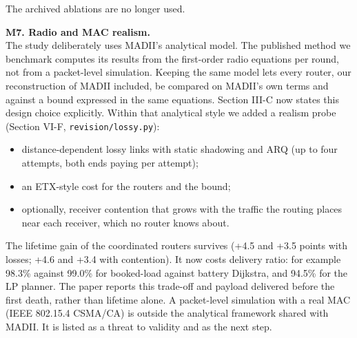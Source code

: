 \documentclass[11pt]{article}
\begin{document}
The archived ablations are no longer used.

\medskip\noindent \textbf{M7. Radio and MAC realism.}\\
The study deliberately uses MADII's analytical model. The published method we benchmark computes its results from the first-order radio equations per round, not from a packet-level simulation. Keeping the same model lets every router, our reconstruction of MADII included, be compared on MADII's own terms and against a bound expressed in the same equations. Section III-C now states this design choice explicitly. Within that analytical style we added a realism probe (Section VI-F, \texttt{revision/lossy.py}):

\begin{itemize}[leftmargin=*,itemsep=2pt]
\item distance-dependent lossy links with static shadowing and ARQ (up to four attempts, both ends paying per attempt);
\item an ETX-style cost for the routers and the bound;
\item optionally, receiver contention that grows with the traffic the routing places near each receiver, which no router knows about.
\end{itemize}

The lifetime gain of the coordinated routers survives (+4.5 and +3.5 points with losses; +4.6 and +3.4 with contention). It now costs delivery ratio: for example 98.3\% against 99.0\% for booked-load against battery Dijkstra, and 94.5\% for the LP planner. The paper reports this trade-off and payload delivered before the first death, rather than lifetime alone. A packet-level simulation with a real MAC (IEEE 802.15.4 CSMA/CA) is outside the analytical framework shared with MADII. It is listed as a threat to validity and as the next step.
\end{document}
